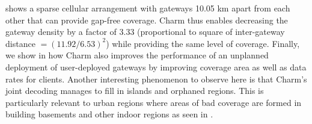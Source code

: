  shows a sparse cellular arrangement with gateways
10.05 km apart from each other that can provide gap-free coverage. Charm thus
enables decreasing the gateway density by a factor of 3.33 (proportional to
square of inter-gateway distance $=(11.92/6.53)^2$) while providing the same
level of coverage. Finally, we show in  how Charm
also improves the performance of an unplanned deployment of user-deployed
gateways by improving coverage area as well as data rates for clients. Another
interesting phenomenon to observe here is that Charm's joint decoding manages
to fill in islands and orphaned regions. This is particularly relevant to
urban regions where areas of bad coverage are formed in building basements and
other indoor regions as seen in .

